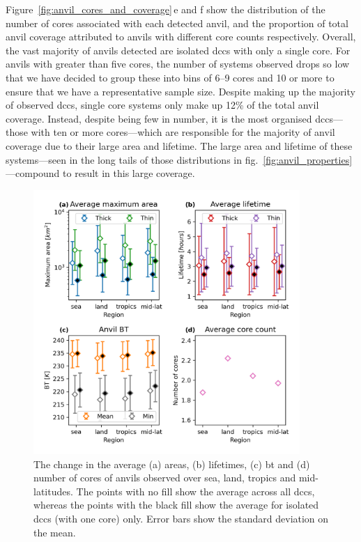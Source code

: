 Figure~\ref{fig:anvil_cores_and_coverage}\,e and f show the distribution of the number of cores associated with each detected anvil, and the proportion of total anvil coverage attributed to anvils with different core counts respectively.
Overall, the vast majority of anvils detected are isolated \acrshort{dcc}s with only a single core.
For anvils with greater than five cores, the number of systems observed drops so low that we have decided to group these into bins of 6--9 cores and 10 or more to ensure that we have a representative sample size.
Despite making up the majority of observed \acrshort{dcc}s, single core systems only make up 12\% of the total anvil coverage.
Instead, despite being few in number, it is the most organised \acrshort{dcc}s---those with ten or more cores---which are responsible for the majority of anvil coverage due to their large area and lifetime.
The large area and lifetime of these systems---seen in the long tails of those distributions in fig.~\ref{fig:anvil_properties}---compound to result in this large coverage.

\begin{figure}[tp]
    \centering
    \includegraphics[width=0.9\textwidth]{figures/chapter2_22.png}
    \caption[
    The change in the average areas, lifetimes, \acrshort{bt} and number of cores of anvils observed over sea, land, tropics and mid-latitudes.
    ]{
    The change in the average (a) areas, (b) lifetimes, (c) \acrshort{bt} and (d) number of cores of anvils observed over sea, land, tropics and mid-latitudes. The points with no fill show the average across all \acrshort{dcc}s, whereas the points with the black fill show the average for isolated \acrshort{dcc}s (with one core) only. Error bars show the standard deviation on the mean.
    }
    \label{fig:anvil_properties_regions}
\end{figure}


